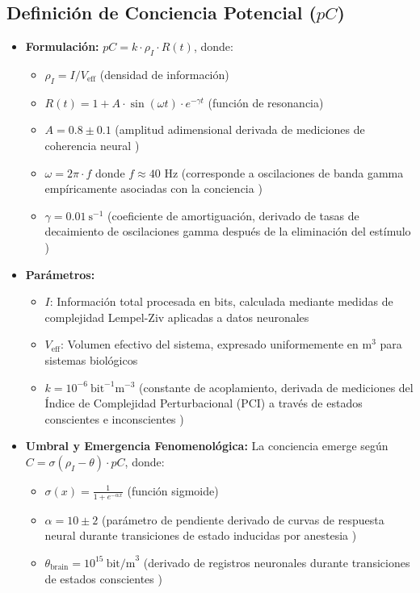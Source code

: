 \documentclass[12pt]{article}
\begin{document}
\subsection{Definición de Conciencia Potencial ($pC$)}
\begin{itemize}
    \item \textbf{Formulación:} $pC = k \cdot \rho_I \cdot R(t)$, donde:
    \begin{itemize}
        \item $\rho_I = I / V_{\text{eff}}$ (densidad de información)
        \item $R(t) = 1 + A \cdot \sin(\omega t) \cdot e^{-\gamma t}$ (función de resonancia)
        \item $A = 0.8 \pm 0.1$ (amplitud adimensional derivada de mediciones de coherencia neural \cite{melloni2007})
        \item $\omega = 2\pi \cdot f$ donde $f \approx 40$ Hz (corresponde a oscilaciones de banda gamma empíricamente asociadas con la conciencia \cite{crick1990,dehaene2011})
        \item $\gamma = 0.01~\text{s}^{-1}$ (coeficiente de amortiguación, derivado de tasas de decaimiento de oscilaciones gamma después de la eliminación del estímulo \cite{buzsaki2004,fries2015})
    \end{itemize}
    
    \item \textbf{Parámetros:} 
    \begin{itemize}[label=--]
        \item $I$: Información total procesada en bits, calculada mediante medidas de complejidad Lempel-Ziv aplicadas a datos neuronales \cite{schartner2015}
        \item $V_{\text{eff}}$: Volumen efectivo del sistema, expresado uniformemente en $\text{m}^3$ para sistemas biológicos
        \item $k = 10^{-6}~\text{bit}^{-1}\text{m}^{-3}$ (constante de acoplamiento, derivada de mediciones del Índice de Complejidad Perturbacional (PCI) a través de estados conscientes e inconscientes \cite{casali2013,casarotto2016})
    \end{itemize}
    
    \item \textbf{Umbral y Emergencia Fenomenológica:} La conciencia emerge según $C = \sigma(\rho_I - \theta) \cdot pC$, donde:
    \begin{itemize}[label=--]
        \item $\sigma(x) = \frac{1}{1 + e^{-\alpha x}}$ (función sigmoide)
        \item $\alpha = 10 \pm 2$ (parámetro de pendiente derivado de curvas de respuesta neural durante transiciones de estado inducidas por anestesia \cite{chennu2014,storm2017})
        \item $\theta_{\text{brain}} = 10^{15}~\text{bit/m}^3$ (derivado de registros neuronales durante transiciones de estados conscientes \cite{tononi2016,mashour2020})
    \end{itemize}
\end{itemize}
\end{document}
